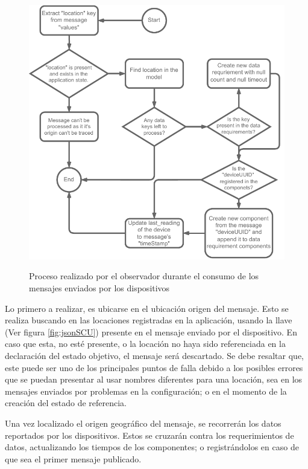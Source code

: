 \begin{figure}[ht]
    \centering
    \caption{Proceso realizado por el observador durante el consumo de los mensajes enviados por los dispositivos} 
    \includegraphics[width=0.85\linewidth]{images/LookerProcessUpdateState.pdf}
    \label{fig:LookerProcessUpdateState}
\end{figure} 

Lo primero a realizar, es ubicarse en el ubicación origen del mensaje. Esto se realiza buscando en las locaciones registradas en la aplicación, usando la llave (Ver figura \ref{fig:jsonSCU}) presente en el mensaje enviado por el dispositivo. En caso que esta, no esté presente, o la locación no haya sido referenciada en la declaración del estado objetivo, el mensaje será descartado. Se debe resaltar que, este puede ser uno de los principales puntos de falla debido a los posibles errores que se puedan presentar al usar nombres diferentes para una locación, sea en los mensajes enviados por problemas en la configuración; o en el momento de la creación del estado de referencia. 

Una vez localizado el origen geográfico del mensaje, se recorrerán los datos reportados por los dispositivos. Estos se cruzarán contra los requerimientos de datos, actualizando los tiempos de los componentes; o registrándolos en caso de que sea el primer mensaje publicado.





